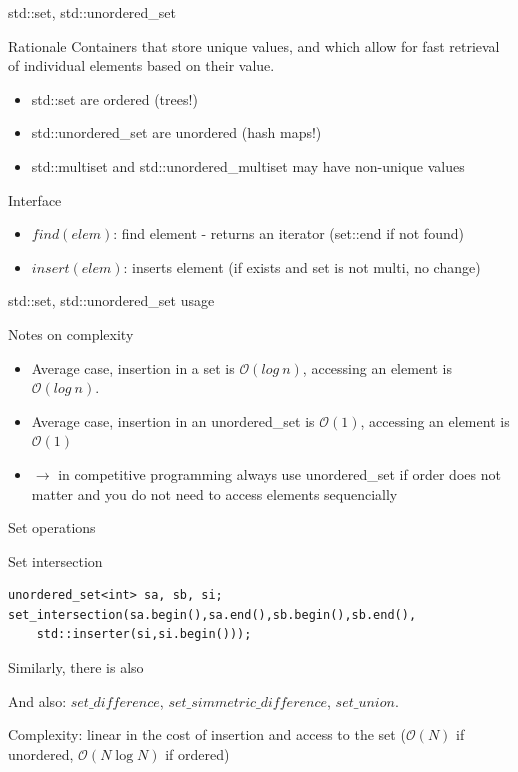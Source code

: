 \documentclass[compress]{beamer}
\begin{document}
\begin{frame}{std::set, std::unordered\_set}
    \begin{block}{Rationale}
        Containers that store unique values, and which allow for fast retrieval of individual elements based on their value.
        \begin{itemize}
            \item std::set are ordered (trees!)
            \item std::unordered\_set are unordered (hash maps!)
            \item std::multiset and std::unordered\_multiset may have non-unique values
        \end{itemize}
    \end{block}\pause

    \begin{block}{Interface}
        \begin{itemize}
            \item $find(elem)$: find element - returns an iterator (set::end if not found)
            \item $insert(elem)$: inserts element (if exists and set is not multi, no change)
        \end{itemize}
    \end{block}
\end{frame}

\begin{frame}{std::set, std::unordered\_set usage}
    \begin{block}{Notes on complexity}
        \begin{itemize}
            \item Average case, insertion in a set is $\mathcal{O}(log~n)$, accessing an element is $\mathcal{O}(log~n)$.
            \item Average case, insertion in an unordered\_set is $\mathcal{O}(1)$, accessing an element is $\mathcal{O}(1)$
            \item $\to$ in competitive programming always use unordered\_set if order does not matter and you do not need to access elements sequencially
        \end{itemize}
    \end{block}
\end{frame}

\begin{frame}[fragile]{Set operations}
    \begin{block}{Set intersection}
        \begin{lstlisting}
unordered_set<int> sa, sb, si;
set_intersection(sa.begin(),sa.end(),sb.begin(),sb.end(),
    std::inserter(si,si.begin()));
\end{lstlisting}

Similarly, there is also

        And also: $set\_difference$, $set\_simmetric\_difference$, $set\_union$.

        Complexity: linear in the cost of insertion and access to the set ($\mathcal{O}(N)$ if unordered, $\mathcal{O}(N \log N)$ if ordered)
    \end{block}
\end{frame}
\end{document}

